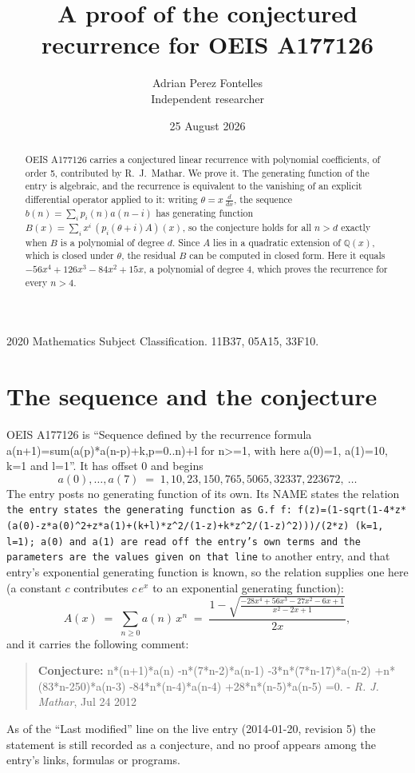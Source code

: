 \documentclass[11pt,a4paper]{article}
\title{A proof of the conjectured recurrence for OEIS A177126}
\author{Adrian Perez Fontelles\\ \small Independent researcher}
\date{25 August 2026}
\theoremstyle{plain}
\theoremstyle{definition}
\begin{document}
\maketitle

\begin{abstract}
OEIS A177126 carries a conjectured linear recurrence with polynomial coefficients, of
order 5, contributed by R.~J.~Mathar. We prove it. The generating function of the
entry is algebraic, and the recurrence is equivalent to the vanishing of an explicit
differential operator applied to it: writing $\theta=x\,\frac{d}{dx}$, the sequence
$b(n)=\sum_{i}p_{i}(n)a(n-i)$ has generating function
$B(x)=\sum_{i}x^{i}\,(p_{i}(\theta+i)A)(x)$, so the conjecture holds for all $n>d$ exactly
when $B$ is a polynomial of degree $d$. Since $A$ lies in a quadratic extension of
$\mathbb{Q}(x)$, which is closed under $\theta$, the residual $B$ can be computed in
closed form. Here it equals $- 56 x^{4} + 126 x^{3} - 84 x^{2} + 15 x$, a polynomial of degree $4$, which proves
the recurrence for every $n>4$.
\end{abstract}

\noindent\small 2020 Mathematics Subject Classification. 11B37, 05A15, 33F10.\normalsize

\section{The sequence and the conjecture}

OEIS A177126 is ``Sequence defined by the recurrence formula a(n+1)=sum(a(p)*a(n-p)+k,p=0..n)+l for n>=1, with here a(0)=1, a(1)=10, k=1 and l=1''. It has offset $0$ and begins
\[
a(0),\dots,a(7)\;=\;1, 10, 23, 150, 765, 5065, 32337, 223672,\ \dots
\]
The entry posts no generating function of its own. Its NAME states the
relation \texttt{the entry states the generating function as G.f f: f(z)=(1-sqrt(1-4*z*(a(0)-z*a(0)\textasciicircum{}2+z*a(1)+(k+l)*z\textasciicircum{}2/(1-z)+k*z\textasciicircum{}2/(1-z)\textasciicircum{}2)))/(2*z) (k=1, l=1); a(0) and a(1) are read off the entry's own terms and the parameters are the values given on that line} to another entry, and that entry's exponential generating
function is known, so the relation supplies one here (a constant $c$ contributes
$c\,e^{x}$ to an exponential generating function):
\begin{equation}\label{eq:gf}
A(x)\;=\;\sum_{n\ge 0} a(n)\,x^{n}\;=\;\frac{1 - \sqrt{\frac{- 28 x^{4} + 56 x^{3} - 27 x^{2} - 6 x + 1}{x^{2} - 2 x + 1}}}{2 x} ,
\end{equation}
and it carries the following comment:
\begin{quote}\small
\textbf{Conjecture:} n*(n+1)*a(n) -n*(7*n-2)*a(n-1) -3*n*(7*n-17)*a(n-2) +n*(83*n-250)*a(n-3) -84*n*(n-4)*a(n-4) +28*n*(n-5)*a(n-5) =0. - \emph{R. J. Mathar}, Jul 24 2012
\end{quote}
As of the ``Last modified'' line on the live entry (2014-01-20, revision 5) the
statement is still recorded as a conjecture, and no proof appears among the entry's links,
formulas or programs.
\end{document}
